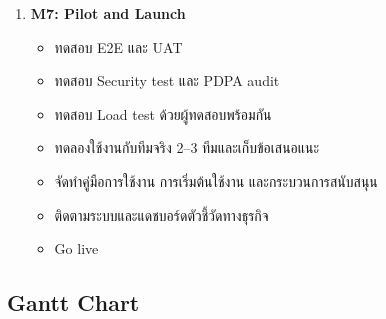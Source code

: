 \begin{enumerate}
  \item \textbf{M7: Pilot and Launch}
    \begin{itemize}
      \item ทดสอบ E2E และ UAT
      \item ทดสอบ Security test และ PDPA audit
      \item ทดสอบ Load test ด้วยผู้ทดสอบพร้อมกัน
      \item ทดลองใช้งานกับทีมจริง 2–3 ทีมและเก็บข้อเสนอแนะ
      \item จัดทำคู่มือการใช้งาน การเริ่มต้นใช้งาน และกระบวนการสนับสนุน
      \item ติดตามระบบและแดชบอร์ดตัวชี้วัดทางธุรกิจ
      \item Go live
    \end{itemize}
\end{enumerate}

\subsection{Gantt Chart}

